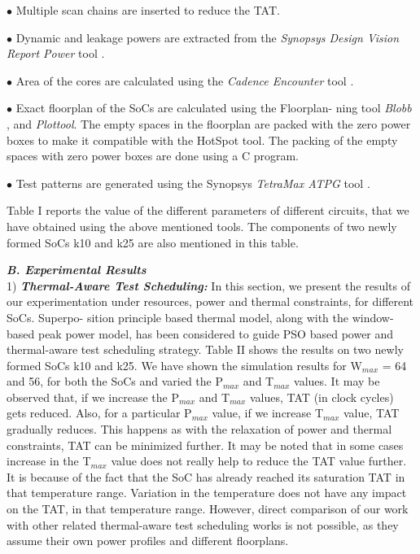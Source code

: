 \documentclass[conference]{IEEEtran}
\begin{document}
$\bullet$ Multiple scan chains are inserted to reduce the TAT.

$\bullet$ Dynamic and leakage powers are extracted from the \textit{Synopsys
Design Vision Report Power} tool \cite{lettnin2004synthesis}.

$\bullet$ Area of the cores are calculated using the \textit{Cadence Encounter}
tool \cite{davis2008big}.

$\bullet$ Exact floorplan of the SoCs are calculated using the Floorplan-
ning tool \textit{Blobb} \cite{chan2004practical} , \cite{kapur2013test} and \textit{Plottool}. The empty spaces in
the floorplan are packed with the zero power boxes to make it
compatible with the HotSpot tool. The packing of the empty
spaces with zero power boxes are done using a C program.

$\bullet$ Test patterns are generated using the Synopsys \textit{TetraMax
ATPG} tool \cite{weed2006chip}.

	\par
	Table I reports the value of the different parameters
of different circuits, that we have obtained using the above
mentioned tools. The components of two newly formed SoCs
k10 and k25 are also mentioned in this table.


\textbf{\textit{B. Experimental Results}}\\

1) \textbf{\textit{Thermal-Aware Test Scheduling:}} In this section, we
present the results of our experimentation under resources,
power and thermal constraints, for different SoCs. Superpo-
sition principle based thermal model, along with the window-
based peak power model, has been considered to guide PSO
based power and thermal-aware test scheduling strategy. Table
II shows the results on two newly formed SoCs k10 and k25.
We have shown the simulation results for W$_{max}$ = 64 and 56,
for both the SoCs and varied the P$_{max}$ and T$_{max}$ values. It may
be observed that, if we increase the P$_{max}$ and T$_{max}$ values,
TAT (in clock cycles) gets reduced. Also, for a particular P$_{max}$
value, if we increase T$_{max}$ value, TAT gradually reduces.
This happens as with the relaxation of power and thermal
constraints, TAT can be minimized further. It may be noted
that in some cases increase in the T$_{max}$ value does not really
help to reduce the TAT value further. It is because of the fact
that the SoC has already reached its saturation TAT in that
temperature range. Variation in the temperature does not have
any impact on the TAT, in that temperature range. However,
direct comparison of our work with other related thermal-aware
test scheduling works is not possible, as they assume their own
power profiles and different floorplans.
\end{document}

